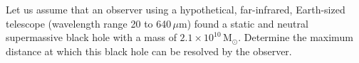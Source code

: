 Let us assume that an observer using a hypothetical, far-infrared, Earth-sized
telescope (wavelength range 20 to 640\,$\mu$m) found a static and neutral
supermassive black hole with a mass of $2.1 \times 10^{10}\,\mathrm{M}_\odot$.
Determine the maximum distance at which this black hole can be resolved by the
observer.

